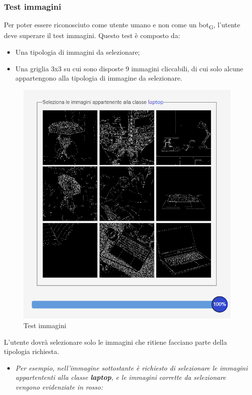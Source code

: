 \subsubsection{Test immagini}
Per poter essere riconosciuto come utente umano e non come un bot\textsubscript{G}, l'utente deve superare il test immagini. Questo test è composto da:
\begin{itemize}
    \item Una tipologia di immagini da selezionare;
	\item Una griglia 3x3 su cui sono disposte 9 immagini cliccabili, di cui solo alcune appartengono alla tipologia di immagine da selezionare.
\end{itemize} 

\begin{figure}[H]
    \centering
    \includegraphics[scale=0.6]{src/img/computerlaptop.png}
    \caption{Test immagini}
\end{figure}

\newpage
 
L'utente dovrà selezionare solo le immagini che ritiene facciano parte della tipologia richiesta. 
\begin{itemize}
	\item \textit{Per esempio, nell'immagine sottostante è richiesto di selezionare le immagini appartententi alla classe \textbf{laptop}, e le immagini corrette da selezionare vengono evidenziate in rosso:}
\end{itemize} 

